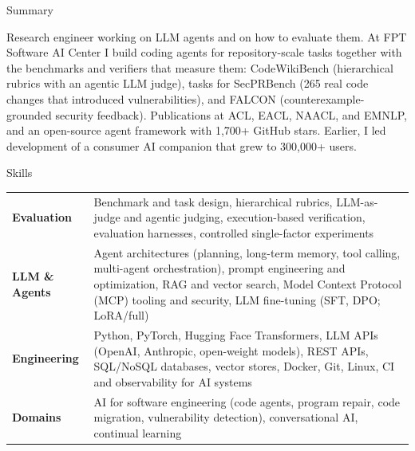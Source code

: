 \documentclass{resume} %
\begin{document}

\begin{rSection}{Summary}

Research engineer working on LLM agents and on how to evaluate them. At FPT
Software AI Center I build coding agents for repository-scale tasks together
with the benchmarks and verifiers that measure them: CodeWikiBench
(hierarchical rubrics with an agentic LLM judge), tasks for SecPRBench (265
real code changes that introduced vulnerabilities), and FALCON
(counterexample-grounded security feedback). Publications at ACL, EACL, NAACL,
and EMNLP, and an open-source agent framework with 1,700+ GitHub stars.
Earlier, I led development of a consumer AI companion that grew to 300,000+
users.

\end{rSection}


\begin{rSection}{Skills}

\begin{tabular}{@{} >{\bfseries}p{} @{\hspace{2ex}} p{}}
Evaluation &
    Benchmark and task design, hierarchical rubrics, LLM-as-judge and agentic
    judging, execution-based verification, evaluation harnesses, controlled
    single-factor experiments \\
LLM \& Agents &
    Agent architectures (planning, long-term memory, tool calling, multi-agent
    orchestration), prompt engineering and optimization, RAG and vector search,
    Model Context Protocol (MCP) tooling and security, LLM fine-tuning
    (SFT, DPO; LoRA/full) \\
Engineering &
    Python, PyTorch, Hugging Face Transformers, LLM APIs (OpenAI, Anthropic,
    open-weight models), REST APIs, SQL/NoSQL databases, vector stores, Docker,
    Git, Linux, CI and observability for AI systems \\
Domains &
    AI for software engineering (code agents, program repair, code migration,
    vulnerability detection), conversational AI, continual learning \\
\end{tabular}

\end{rSection}
\end{document}
